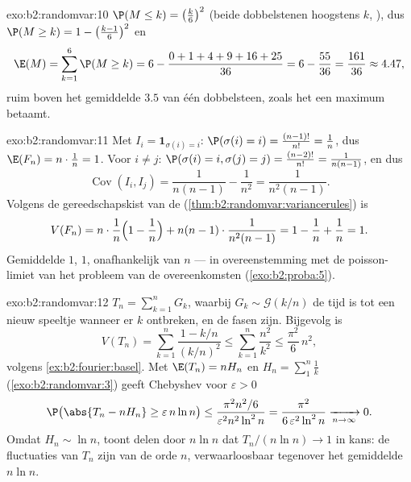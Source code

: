 \begin{solution}{exo:b2:randomvar:10}
$\P(M \leq k) = \bigl(\frac k6\bigr)^2$ (beide dobbelstenen
hoogstens $k$, ), dus $\P(M \geq k) = 1 -
\bigl(\frac{k-1}6\bigr)^2$ en
\[
\E(M) = \sum_{k=1}^6\P(M \geq k)
= 6 - \frac{0 + 1 + 4 + 9 + 16 + 25}{36}
= 6 - \frac{55}{36} = \frac{161}{36} \approx 4.47 ,
\]
ruim boven het gemiddelde $3.5$ van één dobbelsteen, zoals het een
maximum betaamt.
\end{solution}

\begin{solution}{exo:b2:randomvar:11}
Met $I_i = \mathbf 1_{\sigma(i) = i}$: $\P(\sigma(i) = i) =
\frac{(n-1)!}{n!} = \frac1n$, dus $\E(F_n) = n\cdot\frac1n = 1$.
Voor $i \neq j$: $\P(\sigma(i) = i, \sigma(j) = j) =
\frac{(n-2)!}{n!} = \frac1{n(n-1)}$, en dus
\[
\operatorname{Cov}(I_i, I_j) = \frac1{n(n-1)} - \frac1{n^2}
= \frac{1}{n^2(n-1)} .
\]
Volgens de gereedschapskist van de 
(\cref{thm:b2:randomvar:variancerules}) is
\[
V(F_n) = n\cdot\frac1n\Bigl(1 - \frac1n\Bigr)
+ n(n-1)\cdot\frac1{n^2(n-1)}
= 1 - \frac1n + \frac1n = 1 .
\]
Gemiddelde $1$,  $1$, onafhankelijk van $n$ --- in
overeenstemming met de poisson-limiet van het probleem van de
overeenkomsten (\cref{exo:b2:proba:5}).
\end{solution}

\begin{solution}{exo:b2:randomvar:12}
$T_n = \sum_{k=1}^nG_k$, waarbij $G_k \sim \mathcal G(k/n)$ de tijd
is tot een nieuw speeltje wanneer er $k$ ontbreken, en de fasen
 zijn. Bijgevolg is
\[
V(T_n) = \sum_{k=1}^n\frac{1 - k/n}{(k/n)^2}
\leq \sum_{k=1}^n\frac{n^2}{k^2}
\leq \frac{\pi^2}6\,n^2 ,
\]
volgens \cref{ex:b2:fourier:basel}. Met $\E(T_n) = nH_n$ en $H_n =
\sum_1^n\frac1k$ (\cref{exo:b2:randomvar:3}) geeft Chebyshev voor
$\varepsilon > 0$
\[
\P\bigl(\abs{T_n - nH_n} \geq \varepsilon\,n\ln n\bigr)
\leq \frac{\pi^2n^2/6}{\varepsilon^2n^2\ln^2 n}
= \frac{\pi^2}{6\,\varepsilon^2\ln^2n}
\xrightarrow[n\to\infty]{} 0 .
\]
Omdat $H_n \sim \ln n$, toont delen door $n\ln n$ dat $T_n/(n\ln n)
\to 1$ in kans: de fluctuaties van $T_n$ zijn van de orde $n$,
verwaarloosbaar tegenover het gemiddelde $n\ln n$.
\end{solution}

